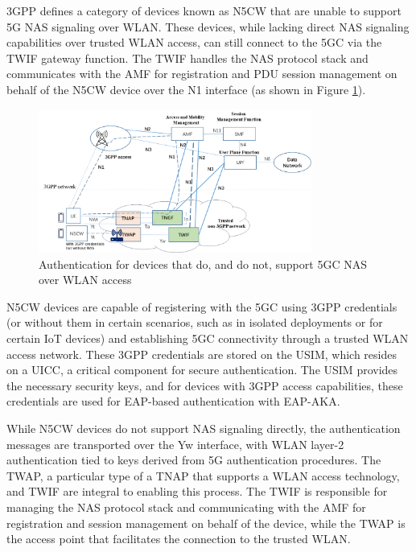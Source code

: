 \ac{3GPP} defines a category of devices known as \ac{N5CW} that are unable to support \ac{5G} \ac{NAS} signaling over \ac{WLAN}. These devices, while lacking direct \ac{NAS} signaling capabilities over trusted \ac{WLAN} access, can still connect to the \ac{5GC} via the \ac{TWIF} gateway function. The \ac{TWIF} handles the \ac{NAS} protocol stack and communicates with the \ac{AMF} for registration and \ac{PDU} session management on behalf of the \ac{N5CW} device over the N1 interface (as shown in Figure \ref{fig:n5cw-twap-twif}).

\begin{figure}[htbp]
    \centering
    \includegraphics[width=0.8\textwidth]{figs/Authentication for devices that do, and do not support 5GC NAS over WLAN access.png}
    \caption{Authentication for devices that do, and do not, support 5GC NAS over WLAN access}
    \label{fig:n5cw-twap-twif}
\end{figure}

\ac{N5CW} devices are capable of registering with the \ac{5GC} using \ac{3GPP} credentials (or without them in certain scenarios, such as in isolated deployments or for certain IoT devices) and establishing \ac{5GC} connectivity through a trusted \ac{WLAN} access network. These \ac{3GPP} credentials are stored on the \ac{USIM}, which resides on a \ac{UICC}, a critical component for secure authentication. The \ac{USIM} provides the necessary security keys, and for devices with \ac{3GPP} access capabilities, these credentials are used for \ac{EAP}-based authentication with \ac{EAP-AKA}.

While \ac{N5CW} devices do not support \ac{NAS} signaling directly, the authentication messages are transported over the \ac{Yw} interface, with \ac{WLAN} layer-2 authentication tied to keys derived from \ac{5G} authentication procedures. The \ac{TWAP}, a particular type of a \ac{TNAP} that supports a WLAN access technology, and \ac{TWIF} are integral to enabling this process. The \ac{TWIF} is responsible for managing the \ac{NAS} protocol stack and communicating with the \ac{AMF} for registration and session management on behalf of the device, while the \ac{TWAP} is the access point that facilitates the connection to the trusted \ac{WLAN}.

